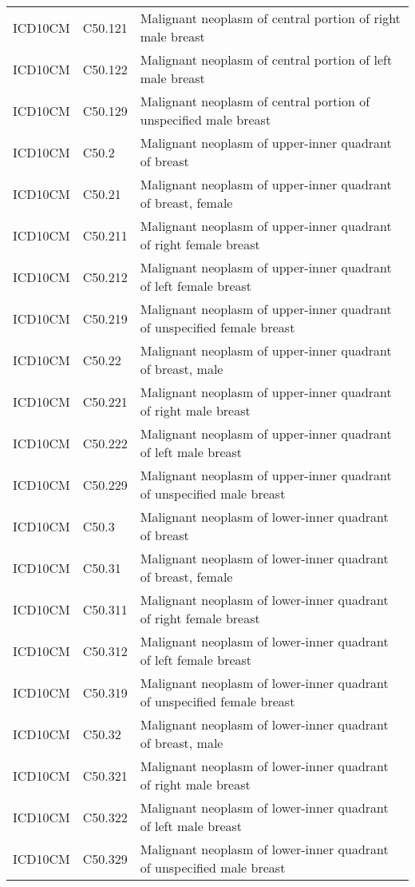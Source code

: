 \begin{longtable}{p{}p{}p{}}
  ICD10CM & C50.121 & Malignant neoplasm of central portion of right male breast \\ 
  ICD10CM & C50.122 & Malignant neoplasm of central portion of left male breast \\ 
  ICD10CM & C50.129 & Malignant neoplasm of central portion of unspecified male breast \\ 
  ICD10CM & C50.2 & Malignant neoplasm of upper-inner quadrant of breast \\ 
  ICD10CM & C50.21 & Malignant neoplasm of upper-inner quadrant of breast, female \\ 
  ICD10CM & C50.211 & Malignant neoplasm of upper-inner quadrant of right female breast \\ 
  ICD10CM & C50.212 & Malignant neoplasm of upper-inner quadrant of left female breast \\ 
  ICD10CM & C50.219 & Malignant neoplasm of upper-inner quadrant of unspecified female breast \\ 
  ICD10CM & C50.22 & Malignant neoplasm of upper-inner quadrant of breast, male \\ 
  ICD10CM & C50.221 & Malignant neoplasm of upper-inner quadrant of right male breast \\ 
  ICD10CM & C50.222 & Malignant neoplasm of upper-inner quadrant of left male breast \\ 
  ICD10CM & C50.229 & Malignant neoplasm of upper-inner quadrant of unspecified male breast \\ 
  ICD10CM & C50.3 & Malignant neoplasm of lower-inner quadrant of breast \\ 
  ICD10CM & C50.31 & Malignant neoplasm of lower-inner quadrant of breast, female \\ 
  ICD10CM & C50.311 & Malignant neoplasm of lower-inner quadrant of right female breast \\ 
  ICD10CM & C50.312 & Malignant neoplasm of lower-inner quadrant of left female breast \\ 
  ICD10CM & C50.319 & Malignant neoplasm of lower-inner quadrant of unspecified female breast \\ 
  ICD10CM & C50.32 & Malignant neoplasm of lower-inner quadrant of breast, male \\ 
  ICD10CM & C50.321 & Malignant neoplasm of lower-inner quadrant of right male breast \\ 
  ICD10CM & C50.322 & Malignant neoplasm of lower-inner quadrant of left male breast \\ 
  ICD10CM & C50.329 & Malignant neoplasm of lower-inner quadrant of unspecified male breast \\ 

\end{longtable}
